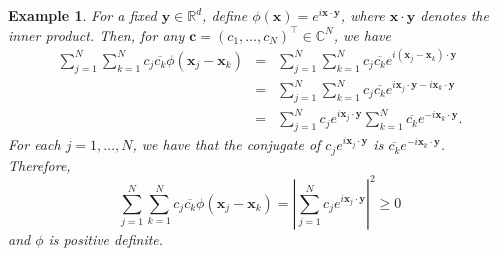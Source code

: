 \documentclass[12pt]{report} %
\newtheorem{example}{Example}
\newcommand{\tmmathbf}[1]{\ensuremath{\boldsymbol{#1}}}
\begin{document}
\begin{example}
  \label{funexampleutil}For a fixed $\tmmathbf{y} \in \mathbb{R}^d$, define
  $\phi (\tmmathbf{x}) = e^{i\tmmathbf{x} \cdot \tmmathbf{y}}$, where
  $\tmmathbf{x} \cdot \tmmathbf{y}$ denotes the inner product. Then, for any
  $\tmmathbf{c}= (c_1, \ldots, c_N)^{\top} \in \mathbb{C}^N$, we have
  \[ \begin{array}{ccc}
      \sum_{j = 1}^N \sum_{k = 1}^N c_j \overline{c_k} \phi (\tmmathbf{x}_j
      -\tmmathbf{x}_k) & = & \sum_{j = 1}^N \sum_{k = 1}^N c_j \overline{c_k}
      e^{i (\tmmathbf{x}_j -\tmmathbf{x}_k) \cdot \tmmathbf{y}}                        \\
                       & = & \sum_{j = 1}^N \sum_{k = 1}^N c_j \overline{c_k}
      e^{i\tmmathbf{x}_j \cdot \tmmathbf{y}- i\tmmathbf{x}_k \cdot
      \tmmathbf{y}}                                                                    \\
                       & = & \sum_{j = 1}^N c_j e^{i\tmmathbf{x}_j \cdot \tmmathbf{y}}
      \sum_{k = 1}^N \overline{c_k} e^{- i\tmmathbf{x}_k \cdot \tmmathbf{y}}
      .
    \end{array} \]
  For each $j = 1, \ldots, N$, we have that the conjugate of $c_j
    e^{i\tmmathbf{x}_j \cdot \tmmathbf{y}}$ is $\overline{c_k} e^{-
        i\tmmathbf{x}_k \cdot \tmmathbf{y}}$. Therefore,
  \begin{equation}
    \sum_{j = 1}^N \sum_{k = 1}^N c_j \overline{c_k} \phi (\tmmathbf{x}_j
    -\tmmathbf{x}_k) = \left| \sum_{j = 1}^N c_j e^{i\tmmathbf{x}_j \cdot
        \tmmathbf{y}} \right|^2 \geq 0 \label{positivedefinitepropertyasmodulus}
  \end{equation}
  and $\phi$ is positive definite.
\end{example}
\end{document}
